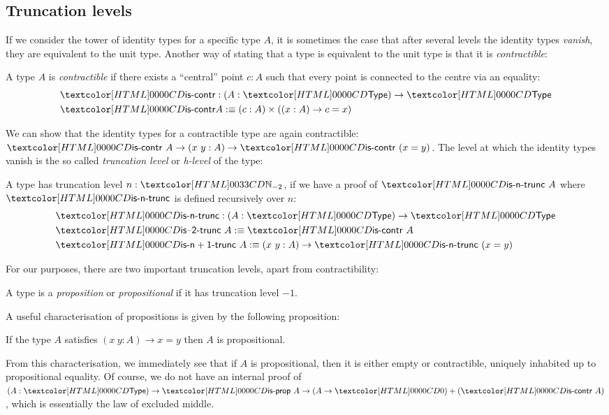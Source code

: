 \subsection{Truncation levels}

If we consider the tower of identity types for a specific type $A$, it
is sometimes the case that after several levels the identity types
\emph{vanish}, \ie they are equivalent to the unit type. Another way
of stating that a type is equivalent to the unit type is that it is
\emph{contractible}:

\begin{definition}
  A type $A$ is \emph{contractible} if there exists a ``central''
  point $c : A$ such that every point is connected to the centre via
  an equality:
  \begin{align*}
    &\iscontr : (A : \Type) \to \Type \\
    &\iscontr A \ddefeq (c : A) \times ((x : A) \to c = x)
  \end{align*}
\end{definition}

We can show that the identity types for a contractible type are again
contractible: $\iscontr\ A \to (x\ y : A) \to \iscontr\ (x = y)$. The
level at which the identity types vanish is the so called
\emph{truncation level} or \emph{h-level} of the type:
\begin{definition}
  A type has truncation level $n : \natty_{-2}$, if we have a proof of
  $\istrunc{n}\ A$ where $\istrunc{n}$ is defined recursively over $n$:
  \begin{align*}
    &\istrunc{n} : (A : \Type) \to \Type \\
    &\istrunc{-2}\ A \ddefeq \iscontr\ A \\
    &\istrunc{n+1}\ A \ddefeq (x\ y : A) \to \istrunc{n}\ (x = y)
  \end{align*}
\end{definition}

For our purposes, there are two important truncation levels, apart
from contractibility:
\begin{definition}
  A type is a \emph{proposition} or \emph{propositional} if it has
  truncation level $-1$.
\end{definition}

A useful characterisation of propositions is given by the following
proposition:
\begin{proposition}
  If the type $A$ satisfies $(x\ y : A) \to x = y$ then $A$ is
  propositional.
\end{proposition}
From this characterisation, we immediately see that if $A$ is
propositional, then it is either empty or contractible, \ie uniquely
inhabited up to propositional equality. Of course, we do not have an
internal proof of
$(A : \Type) \to \isprop\ A \to (A \to \emptyty) + (\iscontr\ A)$,
which is essentially the law of excluded middle.

